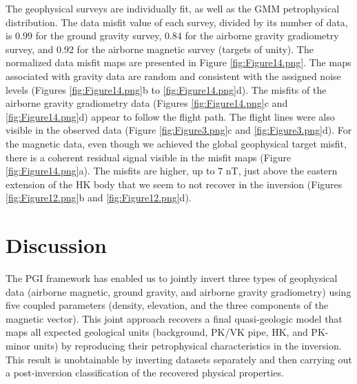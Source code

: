 \documentclass[paper, twocolumn]{geophysics} %
\begin{document}
The geophysical surveys are individually fit, as well as the GMM petrophysical distribution. The data misfit value of each survey, divided by its number of data, is $0.99$ for the ground gravity survey, $0.84$ for the airborne gravity gradiometry survey, and $0.92$ for the airborne magnetic survey (targets of unity). The normalized data misfit maps are presented in Figure \ref{fig:Figure14.png}. The maps associated with gravity data are random and consistent with the assigned noise levels (Figures \ref{fig:Figure14.png}b to \ref{fig:Figure14.png}d). The misfits of the airborne gravity gradiometry data (Figures \ref{fig:Figure14.png}c and \ref{fig:Figure14.png}d) appear to follow the flight path. The flight lines were also visible in the observed data (Figure \ref{fig:Figure3.png}c and \ref{fig:Figure3.png}d). For the magnetic data, even though we achieved the global geophysical target misfit, there is a coherent residual signal visible in the misfit maps (Figure \ref{fig:Figure14.png}a). The misfits are higher, up to $7$ nT, just above the eastern extension of the HK body that we seem to not recover in the inversion (Figures \ref{fig:Figure12.png}b and \ref{fig:Figure12.png}d).


\section{Discussion}

The PGI framework has enabled us to jointly invert three types of geophysical data (airborne magnetic, ground gravity, and airborne gravity gradiometry) using five coupled parameters (density, elevation, and the three components of the magnetic vector). This joint approach recovers a final quasi-geologic model that maps all expected geological units (background, PK/VK pipe, HK, and PK-minor units) by reproducing their petrophysical characteristics in the inversion. This result is unobtainable by inverting datasets separately and then carrying out a post-inversion classification of the recovered physical properties.

\end{document}
